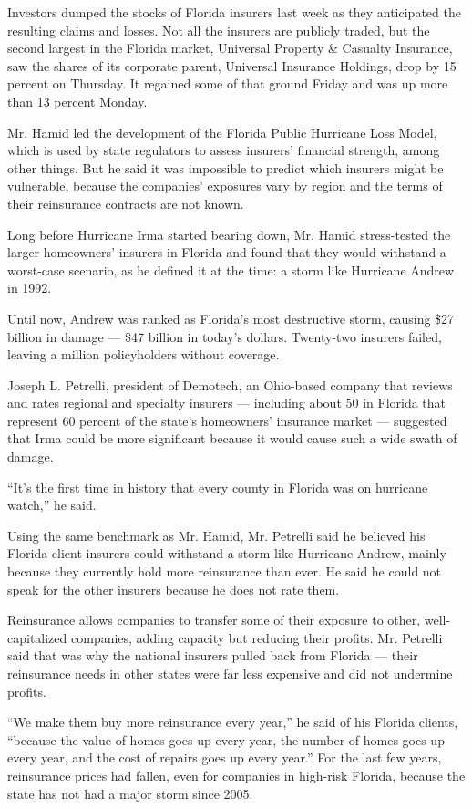 Investors dumped the stocks of Florida insurers last week as they
anticipated the resulting claims and losses. Not all the insurers are
publicly traded, but the second largest in the Florida market, Universal
Property \& Casualty Insurance, saw the shares of its corporate parent,
Universal Insurance Holdings, drop by 15 percent on Thursday. It
regained some of that ground Friday and was up more than 13 percent
Monday.

Mr. Hamid led the development of the Florida Public Hurricane Loss
Model, which is used by state regulators to assess insurers' financial
strength, among other things. But he said it was impossible to predict
which insurers might be vulnerable, because the companies' exposures
vary by region and the terms of their reinsurance contracts are not
known.

Long before Hurricane Irma started bearing down, Mr. Hamid stress-tested
the larger homeowners' insurers in Florida and found that they would
withstand a worst-case scenario, as he defined it at the time: a storm
like Hurricane Andrew in 1992.

Until now, Andrew was ranked as Florida's most destructive storm,
causing \$27 billion in damage --- \$47 billion in today's dollars.
Twenty-two insurers failed, leaving a million policyholders without
coverage.

Joseph L. Petrelli, president of Demotech, an Ohio-based company that
reviews and rates regional and specialty insurers --- including about 50
in Florida that represent 60 percent of the state's homeowners'
insurance market --- suggested that Irma could be more significant
because it would cause such a wide swath of damage.

``It's the first time in history that every county in Florida was on
hurricane watch,'' he said.

Using the same benchmark as Mr. Hamid, Mr. Petrelli said he believed his
Florida client insurers could withstand a storm like Hurricane Andrew,
mainly because they currently hold more reinsurance than ever. He said
he could not speak for the other insurers because he does not rate them.

Reinsurance allows companies to transfer some of their exposure to
other, well-capitalized companies, adding capacity but reducing their
profits. Mr. Petrelli said that was why the national insurers pulled
back from Florida --- their reinsurance needs in other states were far
less expensive and did not undermine profits.

``We make them buy more reinsurance every year,'' he said of his Florida
clients, ``because the value of homes goes up every year, the number of
homes goes up every year, and the cost of repairs goes up every year.''
For the last few years, reinsurance prices had fallen, even for
companies in high-risk Florida, because the state has not had a major
storm since 2005.

